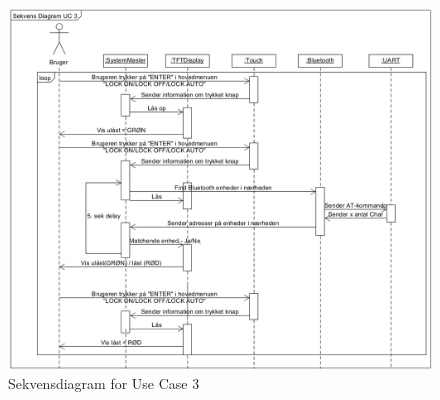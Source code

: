 \hfill \break
\hfill \break
\hfill \break
\hfill \break
\hfill \break
\hfill \break
\hfill \break
\hfill \break
\hfill \break
\hfill \break
\hfill \break
\hfill \break
\hfill \break
\hfill \break
\hfill \break
\hfill \break
\hfill \break


\begin{figure}[H]
	\centering
	\includegraphics[width = 400 pt]{Img/SD3.png}
	\caption{Sekvensdiagram for Use Case 3}
	\label{fig:SD3}
\end{figure}